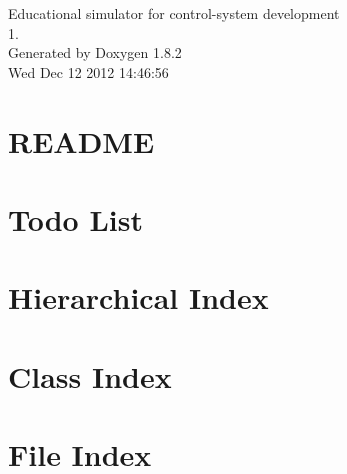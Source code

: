 \documentclass{book}
\begin{document}
\hypersetup{pageanchor=false,citecolor=blue}
\begin{titlepage}
\vspace*{7cm}
\begin{center}
{\Large Educational simulator for control-\/system development \\[1ex]\large 1. }\\
\vspace*{1cm}
{\large Generated by Doxygen 1.8.2}\\
\vspace*{0.5cm}
{\small Wed Dec 12 2012 14:46:56}\\
\end{center}
\end{titlepage}
\clearemptydoublepage
{}
\tableofcontents
\clearemptydoublepage
{}
\hypersetup{pageanchor=true,citecolor=blue}
\chapter{R\-E\-A\-D\-M\-E}
\label{index}\hypertarget{index}{}
\chapter{Todo List}
\label{todo}
\hypertarget{todo}{}

\chapter{Hierarchical Index}

\chapter{Class Index}

\chapter{File Index}

\end{document}
